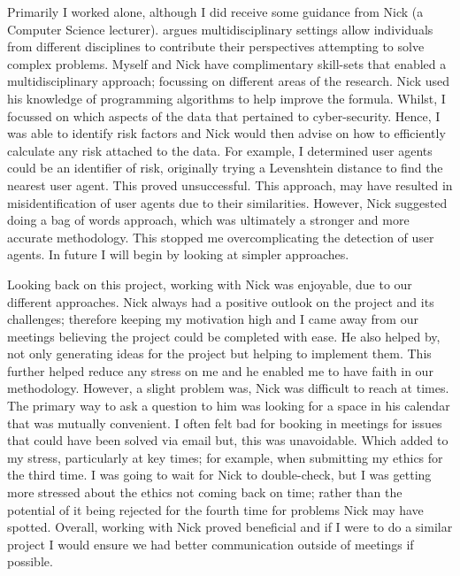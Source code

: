 Primarily I worked alone, although I did receive some guidance from Nick (a Computer Science lecturer). \cite{thurow1999dynamics} argues multidisciplinary settings allow individuals from different disciplines to contribute their perspectives attempting to solve complex problems. Myself and Nick have complimentary skill-sets that enabled a multidisciplinary approach; focussing on different areas of the research. Nick used his knowledge of programming algorithms to help improve the formula. Whilst, I focussed on which aspects of the data that pertained to cyber-security. Hence, I was able to identify risk factors and Nick would then advise on how to efficiently calculate any risk attached to the data. For example, I determined user agents could be an identifier of risk,  originally trying a Levenshtein distance to find the nearest user agent. This proved unsuccessful. This approach, may have resulted in misidentification of user agents due to their similarities. However, Nick suggested doing a bag of words approach, which was ultimately a stronger and more accurate methodology. This stopped me overcomplicating the detection of user agents. In future I will begin by looking at simpler approaches.  


Looking back on this project, working with Nick was enjoyable, due to our different approaches. Nick always had a positive outlook on the project and its challenges; therefore keeping my motivation high and I came away from our meetings believing the project could be completed with ease. He also helped by, not only generating ideas for the project but helping to implement them. This further helped reduce any stress on me and he enabled me to have faith in our methodology. However, a slight problem was, Nick was difficult to reach at times. The primary way to ask a question to him was looking for a space in his calendar that was mutually convenient. I often felt bad for booking in meetings for issues that could have been solved via email but, this was unavoidable. Which added to my stress, particularly at key times; for example, when submitting my ethics for the third time. I was going to wait for Nick to double-check, but I was getting more stressed about the ethics not coming back on time; rather than the potential of it being rejected for the fourth time for problems Nick may have spotted. Overall, working with Nick proved beneficial and if I were to do a similar project I would ensure we had better communication outside of meetings if possible.

